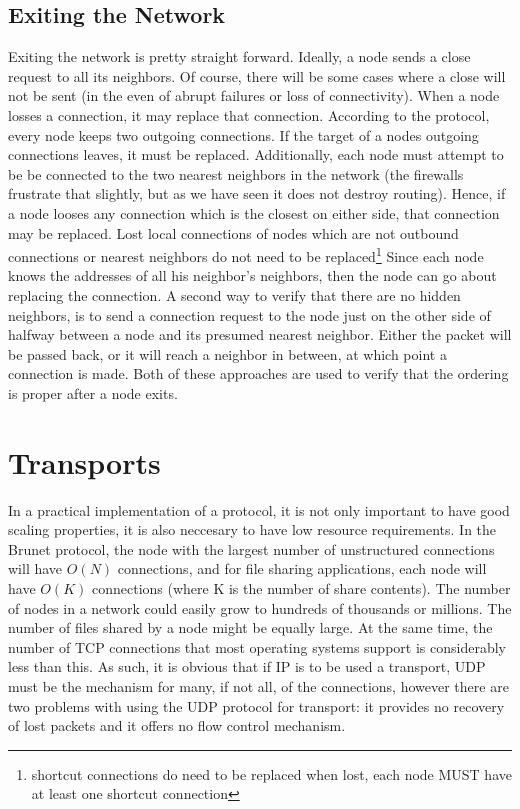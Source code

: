 \documentclass[11pt]{article}
\begin{document}
\subsection{Exiting the Network}
Exiting the network is pretty straight forward.  Ideally, a node sends a close
request to all its neighbors.  Of course, there will be some cases where a
close will not be sent (in the even of abrupt failures or loss of
connectivity).  When a node losses a connection, it may replace that
connection.  According to the protocol, every node keeps two outgoing
connections.  If the target of a nodes outgoing connections leaves, it must be
replaced.  Additionally, each node must attempt to be be connected to the two
nearest neighbors in the network (the firewalls frustrate that slightly, but
as we have seen it does not destroy routing).  Hence, if a node looses any
connection which is the closest on either side, that connection may be
replaced.  Lost local connections of nodes which are not outbound connections or
nearest neighbors do not need to be replaced\footnote{shortcut connections do
need to be replaced when lost, each node MUST have at least one shortcut
connection}
Since each node knows the addresses of all his neighbor's
neighbors, then the node can go about replacing the connection.  A second way
to verify that there are no hidden neighbors, is to send a connection request
to the node just on the other side of halfway between a node and its presumed
nearest neighbor.  Either the packet will be passed back, or it will reach a
neighbor in between, at which point a connection is made.  Both of these
approaches are used to verify that the ordering is proper after a node exits.

\section{Transports}
In a practical implementation of a protocol, it is not only important to have
good scaling properties, it is also neccesary to have low resource
requirements.  In the Brunet protocol, the node with the largest number of
unstructured connections will have $O(N)$ connections, and for file sharing
applications, each node will have $O(K)$ connections (where K is the number of
share contents).  The number of nodes in a network could easily grow to
hundreds of thousands or millions.  The number of files shared by a node might
be equally large.  At the same time, the number of TCP connections that most
operating systems support is considerably less than this.  As such, it is
obvious that if IP is to be used a transport, UDP must be the mechanism for
many, if not all, of the connections, however there are two problems with
using the UDP protocol for transport: it provides no recovery of lost packets
and it offers no flow control mechanism.
\end{document}
